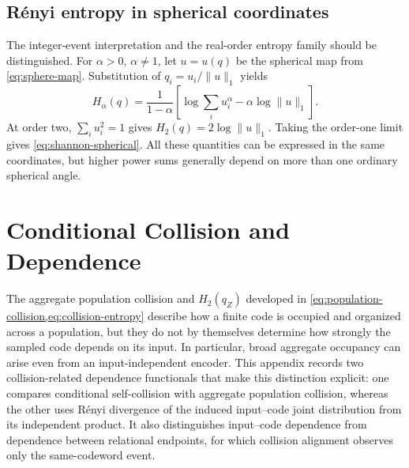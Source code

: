 \subsection{R\'enyi entropy in spherical coordinates}
\label{app:renyi-spherical-coordinates}

The integer-event interpretation and the real-order entropy family should be distinguished.
For $\alpha>0$, $\alpha\ne1$, let $u=u(q)$ be the spherical map from \cref{eq:sphere-map}.
Substitution of $q_i=u_i/\|u\|_1$ yields
\begin{equation}
H_\alpha(q)
=\frac1{1-\alpha}\left[\log\sum_i u_i^\alpha-\alpha\log\|u\|_1\right].
\label{eq:renyi-spherical}
\end{equation}
At order two, $\sum_i u_i^2=1$ gives $H_2(q)=2\log\|u\|_1$.
Taking the order-one limit gives \cref{eq:shannon-spherical}.
All these quantities can be expressed in the same coordinates, but higher power sums generally depend on more than one ordinary spherical angle.

\section{Conditional Collision and Dependence}
\label{app:conditional-collision-dependence}

The aggregate population collision and $H_2(q_Z)$ developed in \cref{eq:population-collision,eq:collision-entropy} describe how a finite code is occupied and organized across a population, but they do not by themselves determine how strongly the sampled code depends on its input.
In particular, broad aggregate occupancy can arise even from an input-independent encoder.
This appendix records two collision-related dependence functionals that make this distinction explicit: one compares conditional self-collision with aggregate population collision, whereas the other uses R\'enyi divergence of the induced input--code joint distribution from its independent product.
It also distinguishes input--code dependence from dependence between relational endpoints, for which collision alignment observes only the same-codeword event.

